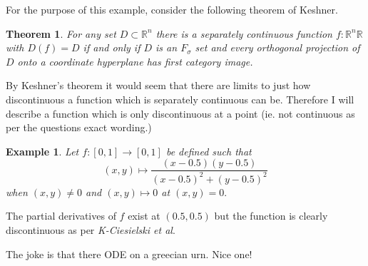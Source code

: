 \documentclass[letter]{article}
\newtheorem{theorem}{Theorem}
\newtheorem{example}{Example}
\newenvironment{menumerate}{%
  \edef\backupindent{\the\parindent}%
  \enumerate%
  \setlength{\parindent}{\backupindent}%
}{\endenumerate}
\begin{document}
\begin{menumerate}
\setcounter{enumi}{40}
\item For the purpose of this example, consider the 
following theorem of Keshner.
    \begin{theorem}
        For any set $D \subset \mathbb{R}^n$ there is a separately continuous
        function $f: \mathbb{R}^n \mathbb{R}$ with $D(f) = D$ if and only if
        $D$ is an $F_\sigma$ set and every orthogonal projection of $D$ onto
        a coordinate hyperplane has first category image.
    \end{theorem}
    By Keshner's theorem it would seem that there are limits
    to just how discontinuous a function which is separately continuous can be.
    Therefore I will describe a function which is only discontinuous at a point
    (ie. not continuous as per the questions exact wording.)
    \begin{example}
        Let $f:[0,1] \to [0,1]$ be defined such that 
        \begin{equation}
            (x,y) \mapsto \frac{(x-0.5)(y-0.5)}{(x-0.5)^2 + (y-0.5)^2}
        \end{equation}
        when $(x,y) \neq 0$ and $(x,y) \mapsto 0$ at $(x,y) = 0.$
    \end{example}
    The partial derivatives of $f$ exist at $(0.5,0.5)$ but the function
        is clearly discontinuous as per \emph{K-Ciesielski et al}. 

\setcounter{enumi}{42}
    \item The joke is that there ODE on a greecian urn. Nice one!

\end{menumerate}
\end{document}
